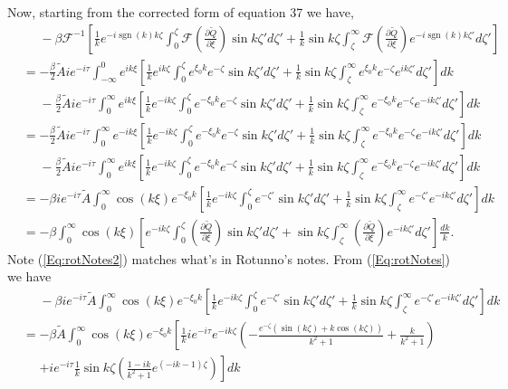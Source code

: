 \documentclass[12pt]{article}
\DeclareMathOperator{\sgn}{sgn}
\begin{document}
Now, starting from the corrected form of equation 37 we have,
\begin{align}
&\phantom{=} -\beta \mathcal{F}^{-1}\left[ \frac{1}{k}e^{-i\sgn(k) k \zeta} \int_0^\zeta \mathcal{F}\left(\frac{\partial \tilde{Q}}{\partial \xi}\right) \sin k\zeta' d\zeta' + \frac{1}{k}\sin k \zeta \int_\zeta^\infty \mathcal{F}\left(\frac{\partial \tilde{Q}}{\partial \xi}\right) e^{-i\sgn(k)k\zeta'} d\zeta' \right]
\label{Eq:start} \\
&=-\frac{\beta}{2} \tilde{A} i e^{-i\tau} \int_{-\infty}^{0} e^{ik\xi} \left[\frac{1}{k}e^{i k \zeta} \int_0^\zeta  e^{\xi_0 k} e^{-\zeta} \sin k\zeta' d\zeta' + \frac{1}{k}\sin k \zeta \int_\zeta^\infty  e^{\xi_0 k} e^{-\zeta} e^{ik\zeta'} d\zeta' \right] dk \\
&\phantom{=} -\frac{\beta}{2} \tilde{A} i e^{-i\tau} \int_{0}^{\infty} e^{ik\xi} \left[\frac{1}{k}e^{-i k \zeta} \int_0^\zeta  e^{-\xi_0 k} e^{-\zeta} \sin k\zeta' d\zeta' + \frac{1}{k}\sin k \zeta \int_\zeta^\infty  e^{-\xi_0 k} e^{-\zeta} e^{-i k\zeta'} d\zeta' \right] dk \\
&= -\frac{\beta}{2} \tilde{A} i e^{-i\tau} \int_{0}^{\infty} e^{-ik\xi} \left[\frac{1}{k}e^{-i k \zeta} \int_0^\zeta  e^{-\xi_0 k} e^{-\zeta} \sin k\zeta' d\zeta' + \frac{1}{k}\sin k \zeta \int_\zeta^\infty  e^{-\xi_0 k} e^{-\zeta} e^{-ik\zeta'} d\zeta' \right] dk \\
&\phantom{=} -\frac{\beta}{2} \tilde{A} i e^{-i\tau} \int_{0}^{\infty} e^{ik\xi} \left[\frac{1}{k}e^{-i k \zeta} \int_0^\zeta  e^{-\xi_0 k} e^{-\zeta} \sin k\zeta' d\zeta' + \frac{1}{k}\sin k \zeta \int_\zeta^\infty e^{-\xi_0 k} e^{-\zeta} e^{-i k\zeta'} d\zeta' \right] dk \\
&=-\beta i e^{-i\tau} \tilde{A} \int_{0}^{\infty} \cos\left(k\xi \right) e^{-\xi_0 k} \left[\frac{1}{k}e^{-i k \zeta} \int_0^\zeta e^{-\zeta'}  \sin k\zeta' d\zeta' + \frac{1}{k}\sin k \zeta \int_\zeta^\infty e^{-\zeta'} e^{-ik\zeta'} d\zeta' \right] dk \label{Eq:rotNotes} \\ 
&=-\beta \int_{0}^{\infty} \cos\left(k\xi \right) \left[e^{-i k \zeta} \int_0^\zeta \left(\frac{\partial \tilde{Q}}{\partial \xi}\right) \sin k\zeta' d\zeta' + \sin k \zeta \int_\zeta^\infty \left(\frac{\partial \tilde{Q}}{\partial \xi}\right) e^{-ik\zeta'} d\zeta' \right] \frac{dk}{k}. \label{Eq:rotNotes2}
\end{align}
Note (\ref{Eq:rotNotes2}) matches what's in Rotunno's notes. From (\ref{Eq:rotNotes}) we have
\begin{align*}
&\phantom{=} -\beta i e^{-i\tau} \tilde{A} \int_{0}^{\infty} \cos\left(k\xi \right) e^{-\xi_0 k} \left[\frac{1}{k}e^{-i k \zeta} \int_0^\zeta e^{-\zeta'}  \sin k\zeta' d\zeta' + \frac{1}{k}\sin k \zeta \int_\zeta^\infty e^{-\zeta'} e^{-ik\zeta'} d\zeta' \right] dk \\ 
& = -\beta \tilde{A} \int_{0}^{\infty} \cos\left(k\xi \right) e^{-\xi_0 k} \left[\frac{1}{k} i e^{-i\tau} e^{-i k \zeta} \left(-\frac{e^{-\zeta}\left(\sin\left(k\zeta\right) + k\cos\left(k\zeta\right)\right)}{k^2+1} + \frac{k}{k^2+1} \right) \right. \\ &\phantom{=} \left. + i e^{-i\tau} \frac{1}{k}\sin k \zeta \left( \frac{1-ik}{k^2+1} e^{\left(-i k - 1\right)\zeta} \right) \right] dk
\end{align*}
\end{document}
